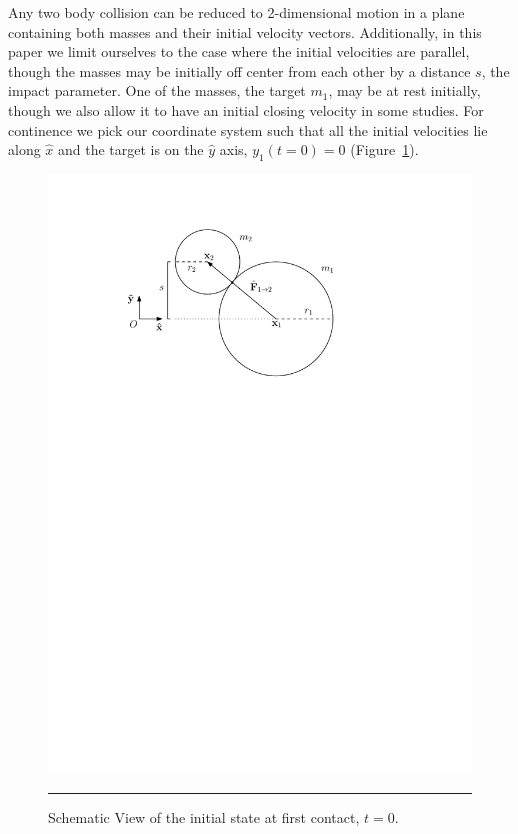 \documentclass[aps,prl,floatfix,preprint,nofootinbib]{revtex4}
\begin{document}
Any two body collision can be reduced to 2-dimensional motion in a plane containing both masses and their initial velocity vectors. Additionally, in this paper we limit ourselves to the case where the initial velocities are parallel, though the masses may be initially off center from each other by a distance $s$, the impact parameter. One of the masses, the target $m_{1}$, may be at rest initially, though we also allow it to have an initial closing velocity in some studies. For continence we pick our coordinate system such that all the initial velocities lie along $\hat{x}$ and the target is on the $\hat{y}$ axis, $y_{1}(t=0)=0$ (Figure~\ref{fig:schematic}).

\begin{figure}[htbc]
  \centering
  \includegraphics[width=.75\textwidth]{plots/cj_diag.pdf}
	          {\par\nobreak\rule[9pt]{35em}{0.5pt}\vspace{-5mm}}
	          \caption{Schematic View of the initial state at first contact, $t = 0$.}
	          \label{fig:schematic}
\end{figure}
\end{document}
